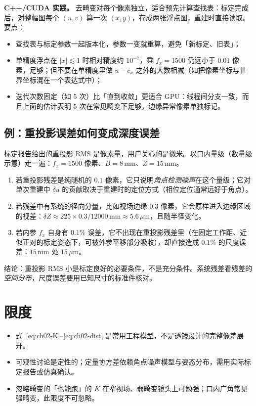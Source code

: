\textbf{C++/CUDA 实践。} 去畸变对每个像素独立，适合预先计算查找表：标定完成后，对整幅图每个 $(u,v)$ 算一次 $(x,y)$，存成两张浮点图，重建时直接读取。要点：
\begin{itemize}
  \item 查找表与标定参数一起版本化，参数一变就重算，避免「新标定、旧表」；
  \item 单精度浮点在 $|x|\lesssim1$ 时相对精度约 $10^{-7}$，乘 $f_x=1500$ 仍远小于 $0.01$ 像素，足够；但不要在单精度里做 $u-c_x$ 之外的大数相减（如把像素坐标与世界坐标混在一个表达式中）；
  \item 迭代次数固定（如 $5$ 次）比「直到收敛」更适合 GPU：线程间分支一致，而且上面的估计表明 $5$ 次在常见畸变下足够，边缘异常像素单独标记。
\end{itemize}

\subsection{例：重投影误差如何变成深度误差}

标定报告给出的重投影 RMS 是像素量，用户关心的是微米。以口内量级（数量级示意）走一遍：$f_x=1500$ 像素、$B=8\,\mathrm{mm}$、$Z=15\,\mathrm{mm}$。

\begin{enumerate}
  \item 若重投影残差是纯随机的 $0.1$ 像素，它只说明\emph{角点检测噪声}在这个量级；它对单次重建中 $\delta u$ 的贡献取决于重建时的定位方式（相位定位通常远好于角点）。
  \item 若残差中有系统的径向分量，比如视场边缘 $0.3$ 像素，它会原样进入边缘区域的视差：$\delta Z\approx225\times0.3/12000\,\mathrm{mm}\approx5.6\,\mu\mathrm{m}$，且随半径变化。
  \item 若内参 $f_x$ 自身有 $0.1\%$ 误差，它不出现在重投影残差里（在固定工作距、近似正对的标定姿态下，可被外参平移部分吸收），却直接造成 $0.1\%$ 的尺度误差：$15\,\mathrm{mm}$ 处 $15\,\mu\mathrm{m}$。
\end{enumerate}
结论：重投影 RMS 小是标定良好的必要条件，不是充分条件。系统残差看残差的\emph{空间分布}，尺度误差要用已知尺寸的标准件核对。

\section{限度}
\label{sec:ch02-limits}

\begin{itemize}
  \item 式~\eqref{eq:ch02-K}--\eqref{eq:ch02-dist} 是常用工程模型，不是透镜设计的完整像差展开。
  \item 可观性讨论是定性的；定量协方差依赖角点噪声模型与姿态分布，需用实际标定报告或仿真确认。
  \item 忽略畸变的「也能跑」的 $K$ 在窄视场、弱畸变镜头上可勉强；口内广角常见强畸变，此限度不可忽略。
\end{itemize}

